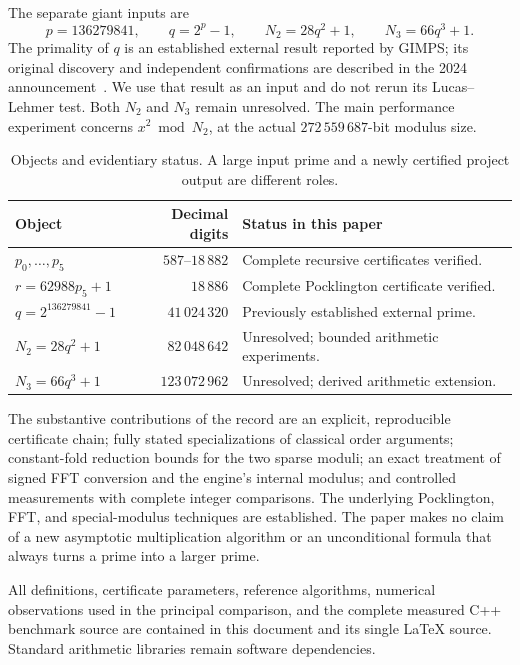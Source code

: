 \documentclass[11pt,a4paper]{article}
\theoremstyle{definition}
\begin{document}
The separate giant inputs are
\begin{equation}\label{eq:giants}
 p=136279841,\qquad q=2^p-1,\qquad
 N_2=28q^2+1,\qquad N_3=66q^3+1.
\end{equation}
The primality of $q$ is an established external result reported by GIMPS;
its original discovery and independent confirmations are described in the
2024 announcement~\cite{gimpsprime}. We use that result as an input and do
not rerun its Lucas--Lehmer test. Both $N_2$ and $N_3$ remain unresolved.
The main performance experiment concerns $x^2\bmod N_2$, at the actual
$272\,559\,687$-bit modulus size.

\begin{table}[htbp]
\centering\small
\caption{Objects and evidentiary status. A large input prime and a newly
certified project output are different roles.}
\label{tab:status}
\begin{tabularx}{\linewidth}{@{}l r X@{}}
\toprule
Object & Decimal digits & Status in this paper\\
\midrule
$p_0,\ldots,p_5$ & $587$--$18\,882$ & Complete recursive certificates verified.\\
$r=62988p_5+1$ & $18\,886$ & Complete Pocklington certificate verified.\\
$q=2^{136279841}-1$ & $41\,024\,320$ & Previously established external prime.\\
$N_2=28q^2+1$ & $82\,048\,642$ & Unresolved; bounded arithmetic experiments.\\
$N_3=66q^3+1$ & $123\,072\,962$ & Unresolved; derived arithmetic extension.\\
\bottomrule
\end{tabularx}
\end{table}

The substantive contributions of the record are an explicit, reproducible
certificate chain; fully stated specializations of classical order arguments;
constant-fold reduction bounds for the two sparse moduli; an exact treatment
of signed FFT conversion and the engine's internal modulus; and controlled
measurements with complete integer comparisons. The underlying Pocklington,
FFT, and special-modulus techniques are established. The paper makes no
claim of a new asymptotic multiplication algorithm or an unconditional formula
that always turns a prime into a larger prime.

All definitions, certificate parameters, reference algorithms, numerical
observations used in the principal comparison, and the complete measured
C++ benchmark source are contained in this document and its single LaTeX
source. Standard arithmetic libraries remain software dependencies.
\end{document}

